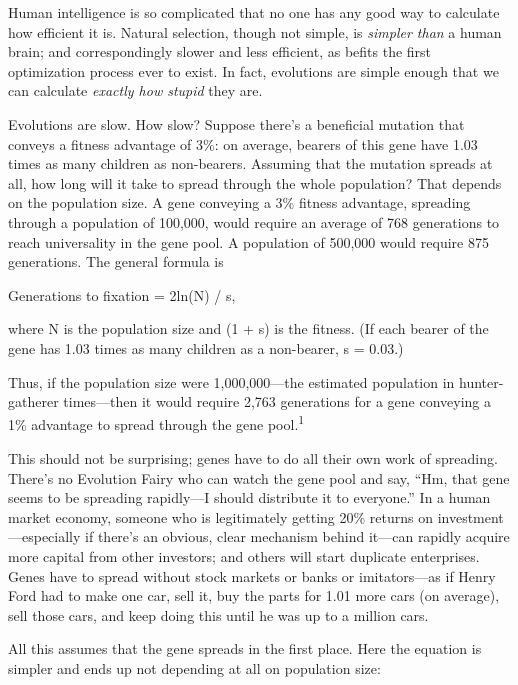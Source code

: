 {
 Human intelligence is so complicated that no one has any good way
to calculate how efficient it is. Natural selection, though not simple,
is \textit{simpler than} a human brain; and correspondingly slower and
less efficient, as befits the first optimization process ever to exist.
In fact, evolutions are simple enough that we can calculate
\textit{exactly how stupid} they are.}

{
 Evolutions are slow. How slow? Suppose there's a
beneficial mutation that conveys a fitness advantage of 3\%: on
average, bearers of this gene have 1.03 times as many children as
non-bearers. Assuming that the mutation spreads at all, how long will
it take to spread through the whole population? That depends on the
population size. A gene conveying a 3\% fitness advantage, spreading
through a population of 100,000, would require an average of 768
generations to reach universality in the gene pool. A population of
500,000 would require 875 generations. The general formula is}

{\centering
 Generations to fixation = 2ln(N) / s,
\par}


\bigskip

{
 where N is the population size and (1 + s) is the fitness. (If
each bearer of the gene has 1.03 times as many children as a
non-bearer, s = 0.03.) }

{
 Thus, if the population size were 1,000,000---the estimated
population in hunter-gatherer times---then it would require 2,763
generations for a gene conveying a 1\% advantage to spread through the
gene pool.\textsuperscript{1}}

{
 This should not be surprising; genes have to do all their own work
of spreading. There's no Evolution Fairy who can watch
the gene pool and say, ``Hm, that gene seems to be
spreading rapidly---I should distribute it to
everyone.'' In a human market economy, someone who is
legitimately getting 20\% returns on investment---especially if
there's an obvious, clear mechanism behind it---can
rapidly acquire more capital from other investors; and others will
start duplicate enterprises. Genes have to spread without stock markets
or banks or imitators---as if Henry Ford had to make one car, sell it,
buy the parts for 1.01 more cars (on average), sell those cars, and
keep doing this until he was up to a million cars.}

{
 All this assumes that the gene spreads in the first place. Here
the equation is simpler and ends up not depending at all on population
size:}

